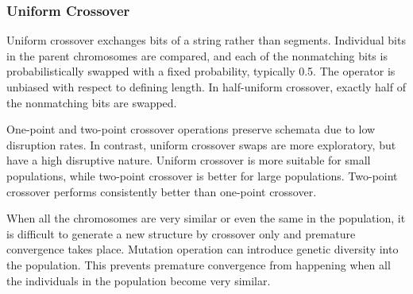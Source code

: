 \documentclass[14pt]{article}
\numberwithin{equation}{subsection}
\begin{document}
			\subsubsection{Uniform Crossover}Uniform crossover exchanges bits of a string rather than segments.
			Individual bits in the parent chromosomes are compared, and each of the nonmatching bits is probabilistically
			swapped with a fixed probability, typically 0.5. The operator is unbiased with respect to defining length. In
			half-uniform crossover, exactly half of the nonmatching bits are swapped. \par
			One-point and two-point	crossover	operations preserve schemata due to low disruption rates. In contrast,
			uniform crossover swaps are more exploratory, but have a high disruptive nature. Uniform crossover is more
			suitable for small populations,	while two-point crossover is better for large populations. Two-point
			crossover performs consistently better than one-point crossover. \par
			When all the chromosomes are very similar or even the same in the population, it is difficult to generate a
			new structure by crossover only and premature convergence takes place. Mutation	operation can introduce
			genetic diversity into the population. This prevents premature convergence from	happening when all the
			individuals in the population become very similar.
			
\end{document}

